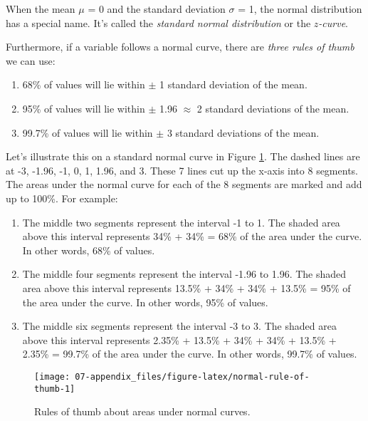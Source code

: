 \documentclass[
  12pt,
  a4paper,
  oneside]{book}
\providecommand{\tightlist}{%
  \setlength{\itemsep}{0pt}\setlength{\parskip}{0pt}}
\begin{document}
When the mean \(\mu\) = 0 and the standard deviation \(\sigma\) = 1, the normal distribution has a special name. It's called the \emph{standard normal distribution} or the \emph{\(z\)-curve}.

Furthermore, if a variable follows a normal curve, there are \emph{three rules of thumb} we can use:

\begin{enumerate}
\def\labelenumi{\arabic{enumi}.}
\tightlist
\item
  68\% of values will lie within \(\pm\) 1 standard deviation of the mean.
\item
  95\% of values will lie within \(\pm\) 1.96 \(\approx\) 2 standard deviations of the mean.
\item
  99.7\% of values will lie within \(\pm\) 3 standard deviations of the mean.
\end{enumerate}

Let's illustrate this on a standard normal curve in Figure \ref{fig:normal-rule-of-thumb}. The dashed lines are at -3, -1.96, -1, 0, 1, 1.96, and 3. These 7 lines cut up the x-axis into 8 segments. The areas under the normal curve for each of the 8 segments are marked and add up to 100\%. For example:

\begin{enumerate}
\def\labelenumi{\arabic{enumi}.}
\tightlist
\item
  The middle two segments represent the interval -1 to 1. The shaded area above this interval represents 34\% + 34\% = 68\% of the area under the curve. In other words, 68\% of values.
\item
  The middle four segments represent the interval -1.96 to 1.96. The shaded area above this interval represents 13.5\% + 34\% + 34\% + 13.5\% = 95\% of the area under the curve. In other words, 95\% of values.
\item
  The middle six segments represent the interval -3 to 3. The shaded area above this interval represents 2.35\% + 13.5\% + 34\% + 34\% + 13.5\% + 2.35\% = 99.7\% of the area under the curve. In other words, 99.7\% of values.
\end{enumerate}

\begin{figure}
\texttt{[image: 07-appendix\_files/figure-latex/normal-rule-of-thumb-1]} \caption{Rules of thumb about areas under normal curves.}\label{fig:normal-rule-of-thumb}
\end{figure}
\end{document}
